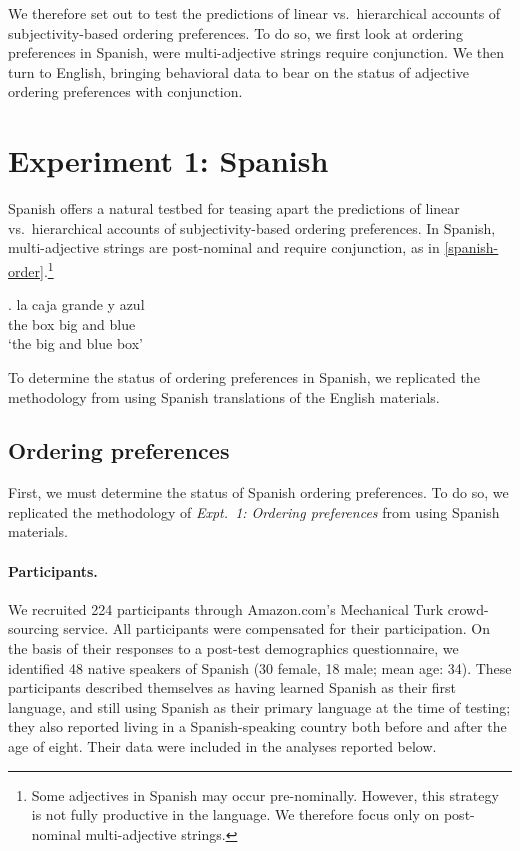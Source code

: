 \documentclass[12pt,letterpaper]{article}
\begin{document}
We therefore set out to test the predictions of linear vs.~hierarchical accounts of subjectivity-based ordering preferences. To do so, we first look at ordering preferences in Spanish, were multi-adjective strings require conjunction. We then turn to English, bringing behavioral data to bear on the status of adjective ordering preferences with conjunction.


\section{Experiment 1: Spanish} \label{spanish}

Spanish offers a natural testbed for teasing apart the predictions of linear vs.~hierarchical accounts of subjectivity-based ordering preferences. In Spanish, multi-adjective strings are post-nominal and require conjunction, as in \ref{spanish-order}.\footnote{Some adjectives in Spanish may occur pre-nominally. However, this strategy is not fully productive in the language. We therefore focus only on post-nominal multi-adjective strings.}

\exg. la caja grande y azul \\
the box big and blue \\
`the big and blue box' \label{spanish-order}

To determine the status of ordering preferences in Spanish, we replicated the methodology from \cite{scontrasetal2017adjectives} using Spanish translations of the English materials.

\subsection{Ordering preferences} 

First, we must determine the status of Spanish ordering preferences. To do so, we replicated the methodology of \emph{Expt.~1: Ordering preferences} from \cite{scontrasetal2017adjectives} using Spanish materials.

\paragraph{Participants.}

We recruited 224 participants through Amazon.com's Mechanical Turk crowd-sourcing service. All participants were compensated for their participation. On the basis of their responses to a post-test demographics questionnaire, we identified 48 native speakers of Spanish (30 female, 18 male; mean age: 34). These participants described themselves as having learned Spanish as their first language, and still using Spanish as their primary language at the time of testing; they also reported living in a Spanish-speaking country both before and after the age of eight. Their data were included in the analyses reported below.
\end{document}
